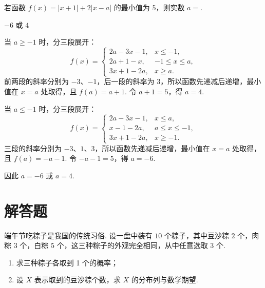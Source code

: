 \begin{problem}
若函数 \( f(x) = |x + 1| + 2|x - a| \) 的最小值为 5，则实数 \( a = \)\fillinblank{}.

\begin{answer}
\(-6\) 或 \(4\)
\end{answer}

\begin{solution}
当 \(a\geqslant-1\) 时，分三段展开：
\[
f(x)=
\begin{cases}
2a-3x-1, & x\leqslant-1,\\
2a+1-x, & -1\leqslant x\leqslant a,\\
3x+1-2a, & x\geqslant a.
\end{cases}
\]
前两段的斜率分别为 \(-3\)、\(-1\)，后一段的斜率为 \(3\)，所以函数先递减后递增，最小值在 \(x=a\) 处取得，且 \(f(a)=a+1\). 令 \(a+1=5\)，得 \(a=4\).

当 \(a\leqslant-1\) 时，分三段展开：
\[
f(x)=
\begin{cases}
2a-3x-1, & x\leqslant a,\\
x-1-2a, & a\leqslant x\leqslant-1,\\
3x+1-2a, & x\geqslant-1.
\end{cases}
\]
三段的斜率分别为 \(-3\)、\(1\)、\(3\)，所以函数先递减后递增，最小值在 \(x=a\) 处取得，且 \(f(a)=-a-1\). 令 \(-a-1=5\)，得 \(a=-6\).

因此 \(a=-6\) 或 \(a=4\).
\end{solution}
\end{problem}

\section{解答题}

\begin{problem}
端午节吃粽子是我国的传统习俗. 设一盘中装有 \(10\) 个粽子，其中豆沙粽 \(2\) 个，肉粽 \(3\) 个，白粽 \(5\) 个，这三种粽子的外观完全相同，从中任意选取 \(3\) 个.

\begin{enumerate}
\item 求三种粽子各取到 1 个的概率；
\item 设 \(X\) 表示取到的豆沙粽个数，求 \(X\) 的分布列与数学期望.
\end{enumerate}
\end{problem}

